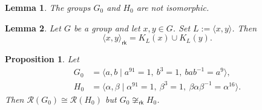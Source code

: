 \documentclass[10pt,a4paper]{amsart}
\newtheorem{prop}{Proposition}
\newtheorem{lem}{Lemma}
\begin{document}
\begin{lem}\label{lem:g0h0}
  The groups $G_0$ and $H_0$ are not isomorphic.
\end{lem}

\begin{lem}\label{lem:pair}
  Let $G$ be a group and let $x,y\in G$. Set $L:=\langle x,y\rangle$. Then
  $$ \langle x,y\rangle_{\mathsf{rk}}=K_L(x)\cup K_L(y). $$
\end{lem}

\begin{prop}\label{prop:ex}
  Let
  \begin{align*}
    G_0 &= \langle a,b\mid a^{91} = 1,\ b^3 = 1,\ bab^{-1} = a^9\rangle, \\
    H_0 &= \langle \alpha,\beta\mid \alpha^{91} = 1,\ \beta^3 = 1,\ \beta\alpha\beta^{-1} = \alpha^{16}\rangle.
  \end{align*}
  Then $\mathcal{R}(G_0)\cong \mathcal{R}(H_0)$ but $G_0\not\cong_{\mathsf{rk}}H_0$.
\end{prop}
\end{document}
